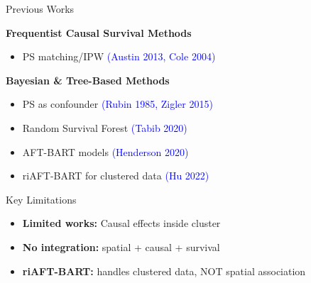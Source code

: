 \documentclass{beamer}
\begin{document}
\begin{frame}{Previous Works}

\textbf{Frequentist Causal Survival Methods}
\begin{itemize}
    \item PS matching/IPW \textcolor{blue}{(Austin 2013, Cole 2004)}
\end{itemize}


\textbf{Bayesian \& Tree-Based Methods}
\begin{itemize}
    \item PS as confounder \textcolor{blue}{(Rubin 1985, Zigler 2015)}
    \item  Random Survival Forest \textcolor{blue}{(Tabib 2020)}
    \item AFT-BART models \textcolor{blue}{(Henderson 2020)}
    \item riAFT-BART for clustered data \textcolor{blue}{(Hu 2022)}
    
\end{itemize}
\pause
\begin{alertblock}{Key Limitations}
\begin{itemize}
    \item \textbf{Limited works:} Causal effects inside cluster
    \item \textbf{No integration:} spatial + causal + survival
    \item \textbf{ riAFT-BART:} handles clustered data, NOT spatial association

\end{itemize}
\end{alertblock}

\end{frame}
\end{document}
